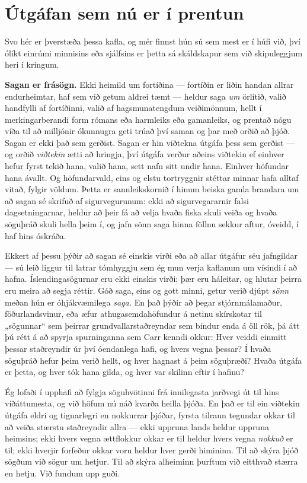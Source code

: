 \section*{Útgáfan sem nú er í prentun}

Svo hér er þverstæða þessa kafla, og mér finnst hún sú sem mest er í húfi við, því ólíkt einrúmi minnisins eða sjálfsins er þetta sá skáldskapur sem við skipuleggjum heri í kringum.

\textbf{Sagan er frásögn.} Ekki heimild um fortíðina — fortíðin er liðin handan allrar endurheimtar, haf sem við getum aldrei tæmt — heldur saga \emph{um} örlítið, valið handfylli af fortíðinni, valið af hagsmunatengdum veiðimönnum, hellt í merkingarberandi form rómans eða harmleiks eða gamanleiks, og prentað nógu víða til að milljónir ókunnugra geti trúað því saman og þar með orðið að þjóð. Sagan er ekki það sem gerðist. Sagan er hin viðtekna útgáfa þess sem gerðist — og orðið \emph{viðtekin} ætti að hringja, því útgáfa verður aðeins viðtekin ef einhver hefur fyrst tekið hana, valið hana, sett nafn sitt undir hana. Einhver höfundar hana ávallt. Og höfundarvald, eins og elstu tortryggnir stéttar minnar hafa alltaf vitað, fylgir völdum. Þetta er sannleikskornið í hinum beiska gamla brandara um að sagan sé skrifuð af sigurvegurunum: ekki að sigurvegararnir falsi dagsetningarnar, heldur að þeir fá að velja hvaða fiska skuli veiða og hvaða söguþráð skuli hella þeim í, og jafn sönn saga hinna föllnu sekkur aftur, óveidd, í haf hins óskráða.

Ekkert af þessu þýðir að sagan sé einskis virði eða að allar útgáfur séu jafngildar — sú leið liggur til latrar tómhyggju sem ég mun verja kaflanum um vísindi í að hafna. Íslendingasögurnar eru ekki einskis virði; þær eru háleitar, og hlutar þeirra eru meira að segja réttir. Góð saga, eins og gott minni, getur verið djúpt \emph{sönn} meðan hún er óhjákvæmilega \emph{saga.} En það þýðir að þegar stjórnmálamaður, föðurlandsvinur, eða æfur athugasemdahöfundur á netinu skírskotar til „sögunnar“ sem þeirrar grundvallarstaðreyndar sem bindur enda á öll rök, þá átt þú rétt á að spyrja spurninganna sem Carr kenndi okkur: Hver veiddi einmitt þessar staðreyndir úr því óendanlega hafi, og hvers vegna þessar? Í hvaða söguþráð hefur þeim verið hellt, og hver hagnast á þeim söguþræði? Hvaða útgáfa er þetta, og hver tók hana gilda, og hver var skilinn eftir í hafinu?

Ég lofaði í upphafi að fylgja söguhvötinni frá innilegasta jarðvegi út til hins víðáttumesta, og við höfum nú náð kvarða heilla þjóða. En það er til ein viðtekin útgáfa eldri og tignarlegri en nokkurrar þjóðar, fyrsta tilraun tegundar okkar til að veiða stærstu staðreyndir allra — ekki uppruna lands heldur uppruna heimsins; ekki hvers vegna ættflokkur okkar er til heldur hvers vegna \emph{nokkuð} er til; ekki hverjir forfeður okkar voru heldur hver gerði himininn. Til að skýra þjóð sögðum við sögur um hetjur. Til að skýra alheiminn þurftum við eitthvað stærra en hetju. Við fundum upp guði.

